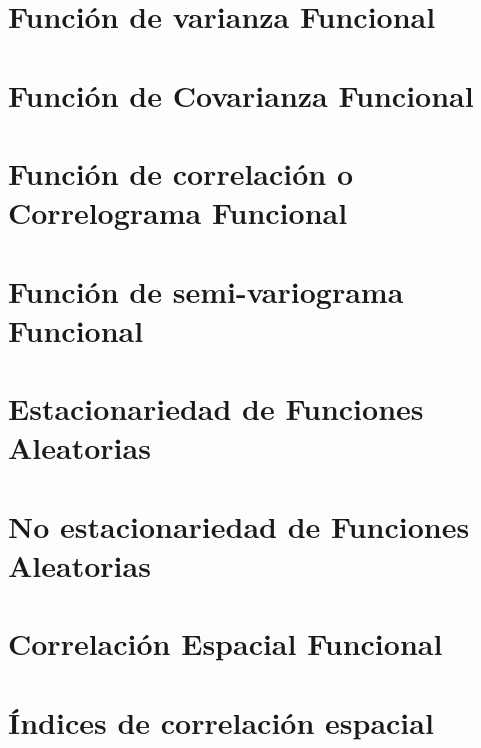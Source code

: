 \documentclass[
]{book}
\begin{document}
\hypertarget{funciuxf3n-de-varianza-funcional}{%
\section{Función de varianza Funcional}\label{funciuxf3n-de-varianza-funcional}}

\hypertarget{funciuxf3n-de-covarianza-funcional}{%
\section{Función de Covarianza Funcional}\label{funciuxf3n-de-covarianza-funcional}}

\hypertarget{funciuxf3n-de-correlaciuxf3n-o-correlograma-funcional}{%
\section{Función de correlación o Correlograma Funcional}\label{funciuxf3n-de-correlaciuxf3n-o-correlograma-funcional}}

\hypertarget{funciuxf3n-de-semi-variograma-funcional}{%
\section{Función de semi-variograma Funcional}\label{funciuxf3n-de-semi-variograma-funcional}}

\hypertarget{estacionariedad-de-funciones-aleatorias-1}{%
\section{Estacionariedad de Funciones Aleatorias}\label{estacionariedad-de-funciones-aleatorias-1}}

\hypertarget{no-estacionariedad-de-funciones-aleatorias-1}{%
\section{No estacionariedad de Funciones Aleatorias}\label{no-estacionariedad-de-funciones-aleatorias-1}}

\hypertarget{correlaciuxf3n-espacial-funcional}{%
\section{Correlación Espacial Funcional}\label{correlaciuxf3n-espacial-funcional}}

\hypertarget{uxedndices-de-correlaciuxf3n-espacial}{%
\section{Índices de correlación espacial}\label{uxedndices-de-correlaciuxf3n-espacial}}
\end{document}
